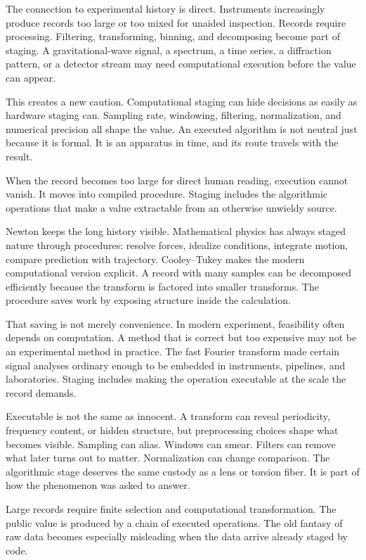 The connection to experimental history is direct. Instruments increasingly
produce records too large or too mixed for unaided inspection. Records
require processing. Filtering, transforming, binning, and decomposing become
part of staging. A gravitational-wave signal, a spectrum, a time series, a diffraction
pattern, or a detector stream may need computational execution before the
value can appear.

This creates a new caution. Computational staging can hide decisions as
easily as hardware staging can. Sampling rate, windowing, filtering,
normalization, and numerical precision all shape the value. An executed
algorithm is not neutral just because it is formal. It is an apparatus in
time, and its route travels with the result.

When the record becomes too large for direct human reading, execution cannot
vanish. It moves into compiled procedure. Staging includes the algorithmic
operations that make a value extractable from an otherwise unwieldy source.

Newton keeps the long history visible. Mathematical physics has always staged
nature through procedures: resolve forces, idealize conditions, integrate
motion, compare prediction with trajectory. Cooley--Tukey makes the modern
computational version explicit. A record with many samples can be decomposed
efficiently because the transform is factored into smaller transforms. The
procedure saves work by exposing structure inside the calculation.

That saving is not merely convenience. In modern experiment, feasibility often
depends on computation. A method that is correct but too expensive may not be
an experimental method in practice. The fast Fourier transform made certain
signal analyses ordinary enough to be embedded in instruments, pipelines, and
laboratories. Staging includes making the operation executable at the scale
the record demands.

Executable is not the same as innocent. A transform can reveal periodicity,
frequency content, or hidden structure, but preprocessing choices shape what
becomes visible. Sampling can alias. Windows can smear. Filters
can remove what later turns out to matter. Normalization can change
comparison. The algorithmic stage deserves the same custody as a lens or
torsion fiber. It is part of how the phenomenon was asked to answer.

Large records require finite selection and computational transformation. The
public value is produced by a chain of executed operations. The old fantasy of
raw data becomes especially misleading when the data arrive already staged by
code.

